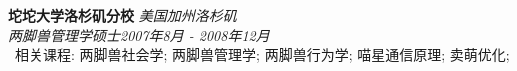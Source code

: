 {{\bf 坨坨大学洛杉矶分校} \hfill {\em 美国加州洛杉矶} \\
{\em 两脚兽管理学硕士}\hfill {\em 2007年8月 - 2008年12月}\\
\smallskip
\textbullet \ {相关课程: 两脚兽社会学; 两脚兽管理学; 两脚兽行为学; 喵星通信原理; 卖萌优化; }}
